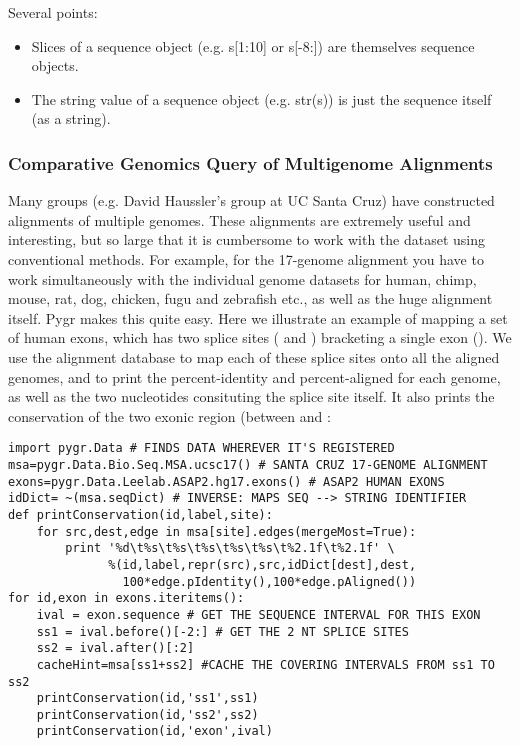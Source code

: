 \documentclass{howto}
\begin{document}
Several points:
\begin{itemize}

\item
   Slices of a sequence object (e.g. s[1:10] or s[-8:]) are themselves sequence objects.

\item    
The string value of a sequence object (e.g. str(s)) is just the sequence itself (as a string).

\end{itemize}

\subsubsection{Comparative Genomics Query of Multigenome Alignments}

Many groups (e.g. David Haussler's group at UC Santa Cruz) have constructed alignments of multiple genomes.  These alignments are extremely useful and interesting, but so large that it is cumbersome to work with the dataset using conventional methods.  For example, for the 17-genome alignment you have to work simultaneously with the individual genome datasets for human, chimp, mouse, rat, dog, chicken, fugu and zebrafish etc., as well as the huge alignment itself.  Pygr makes this quite easy.  Here we illustrate an example of mapping a set of human exons, which has two splice sites
( and ) bracketing a single exon ().
We use the alignment database to map each of these splice sites onto all the aligned
genomes, and to print the percent-identity and percent-aligned for each genome,
as well as the two nucleotides consituting the splice site itself.
It also prints the conservation of the two exonic region (between 
and : 

\begin{verbatim}
import pygr.Data # FINDS DATA WHEREVER IT'S REGISTERED
msa=pygr.Data.Bio.Seq.MSA.ucsc17() # SANTA CRUZ 17-GENOME ALIGNMENT
exons=pygr.Data.Leelab.ASAP2.hg17.exons() # ASAP2 HUMAN EXONS
idDict= ~(msa.seqDict) # INVERSE: MAPS SEQ --> STRING IDENTIFIER
def printConservation(id,label,site):
    for src,dest,edge in msa[site].edges(mergeMost=True):
        print '%d\t%s\t%s\t%s\t%s\t%s\t%2.1f\t%2.1f' \
              %(id,label,repr(src),src,idDict[dest],dest,
                100*edge.pIdentity(),100*edge.pAligned())
for id,exon in exons.iteritems():
    ival = exon.sequence # GET THE SEQUENCE INTERVAL FOR THIS EXON
    ss1 = ival.before()[-2:] # GET THE 2 NT SPLICE SITES
    ss2 = ival.after()[:2]
    cacheHint=msa[ss1+ss2] #CACHE THE COVERING INTERVALS FROM ss1 TO ss2
    printConservation(id,'ss1',ss1)
    printConservation(id,'ss2',ss2)
    printConservation(id,'exon',ival)
\end{verbatim}
\end{document}
